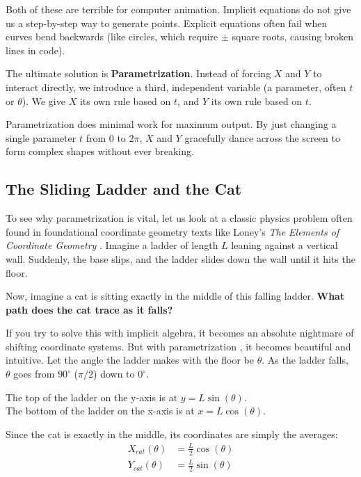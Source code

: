 \documentclass[12pt, a4paper]{report}
\begin{document}
Both of these are terrible for computer animation. Implicit equations do not give us a step-by-step way to generate points. Explicit equations often fail when curves bend backwards (like circles, which require $\pm$ square roots, causing broken lines in code). 

The ultimate solution is \textbf{Parametrization}. Instead of forcing $X$ and $Y$ to interact directly, we introduce a third, independent variable (a parameter, often $t$ or $\theta$). We give $X$ its own rule based on $t$, and $Y$ its own rule based on $t$. 

Parametrization does minimal work for maximum output. By just changing a single parameter $t$ from $0$ to $2\pi$, $X$ and $Y$ gracefully dance across the screen to form complex shapes without ever breaking.

\subsection{The Sliding Ladder and the Cat}

To see why parametrization is vital, let us look at a classic physics problem often found in foundational coordinate geometry texts like Loney's \textit{The Elements of Coordinate Geometry} \cite{loney1895}. Imagine a ladder of length $L$ leaning against a vertical wall. Suddenly, the base slips, and the ladder slides down the wall until it hits the floor. 

Now, imagine a cat is sitting exactly in the middle of this falling ladder. \textbf{What path does the cat trace as it falls?}

If you try to solve this with implicit algebra, it becomes an absolute nightmare of shifting coordinate systems. But with parametrization \cite{loney1895}, it becomes beautiful and intuitive. Let the angle the ladder makes with the floor be $\theta$. As the ladder falls, $\theta$ goes from $90^\circ$ ($\pi/2$) down to $0^\circ$.

The top of the ladder on the y-axis is at $y = L \sin(\theta)$. \\
The bottom of the ladder on the x-axis is at $x = L \cos(\theta)$.

Since the cat is exactly in the middle, its coordinates are simply the averages:
\begin{align}
    X_{cat}(\theta) &= \frac{L}{2} \cos(\theta) \\
    Y_{cat}(\theta) &= \frac{L}{2} \sin(\theta)
\end{align}
\end{document}
